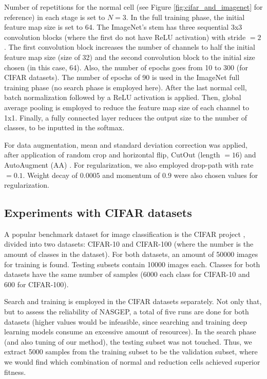 \documentclass[conference]{IEEEtran}
\begin{document}
	Number of repetitions for the normal cell (see Figure \ref{fig:cifar_and_imagenet} for reference) in each stage is set to $N=3$.
	In the full training phase, the initial feature map size is set to 64.
	The ImageNet's stem has three sequential 3x3 convolution blocks (where the first do not have ReLU activation) with stride $=2$.
	The first convolution block increases the number of channels to half the initial feature map size (size of 32) and the second convolution block to the initial size chosen (in this case, 64).
	Also, the number of epochs goes from 10 to 300 (for CIFAR datasets).
	The number of epochs of 90 is used in the ImageNet full training phase (no search phase is employed here).
	After the last normal cell, batch normalization followed by a ReLU activation is applied. 
	Then, global average pooling is employed to reduce the feature map size of each channel to 1x1.
	Finally, a fully connected layer reduces the output size to the number of classes, to be inputted in the softmax. 
	
	For data augmentation, mean and standard deviation correction was applied, after application of random crop and horizontal flip, CutOut \cite{devries2017improved} (length $=16$) and AutoAugment (AA) \cite{cubuk2018autoaugment}. For regularization, we also employed drop-path \cite{larsson2016fractalnet} with rate $=0.1$.  
	Weight decay of $0.0005$ and momentum of $0.9$ were also chosen values for regularization.
	
	\subsection{Experiments with CIFAR datasets}
	
	A popular benchmark dataset for image classification is the CIFAR project \cite{krizhevsky2009learning}, divided into two datasets: CIFAR-10 and CIFAR-100 (where the number is the amount of classes in the dataset).
	For both datasets, an amount of 50000 images for training is found. Testing subsets contain 10000 images each. Classes for both datasets have the same number of samples (6000 each class for CIFAR-10 and 600 for CIFAR-100).
	
	Search and training is employed in the CIFAR datasets separately.
	Not only that, but to assess the reliability of NASGEP, a total of five runs are done for both datasets (higher values would be infeasible, since searching and training deep learning models consume an excessive amount of resources).
	In the search phase (and also tuning of our method), the testing subset was not touched. 
	Thus, we extract 5000 samples from the training subset to be the validation subset, where we would find which combination of normal and reduction cells achieved superior fitness.
	
\end{document}
